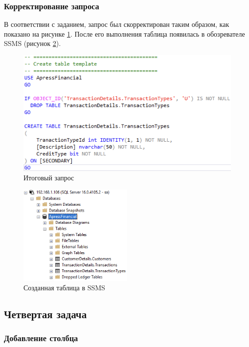 \documentclass[a4paper, 14pt]{extarticle}
\begin{document}
\subsubsection{Корректирование запроса}

В соответствии с заданием, запрос был скорректирован таким образом, как показано
на рисунке \ref{fig:task-3-6}. После его выполнения таблица появилась в
обозревателе SSMS (рисунок \ref{fig:task-3-7}).

\begin{figure}[H]
  \centering
  \includegraphics[width=\textwidth]{images/task-3/6.png}
  \caption{Итоговый запрос}
  \label{fig:task-3-6}
\end{figure}

\begin{figure}[H]
  \centering
  \includegraphics[width=0.5\textwidth]{images/task-3/7.png}
  \caption{Созданная таблица в SSMS}
  \label{fig:task-3-7}
\end{figure}

\subsection{Четвертая задача}

\subsubsection{Добавление столбца}
\end{document}
